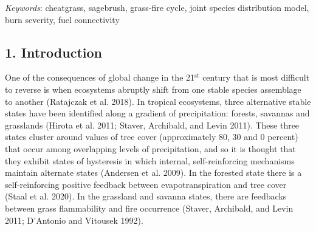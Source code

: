 \documentclass[
  12pt,
]{article}
\begin{document}
\vspace{3mm}
\vspace{5mm}

\emph{Keywords}: cheatgrass, sagebrush, grass-fire cycle, joint species
distribution model, burn severity, fuel connectivity

\newpage

\hypertarget{introduction}{%
\subsection{1. Introduction}\label{introduction}}

One of the consequences of global change in the 21\(^\text{st}\) century
that is most difficult to reverse is when ecosystems abruptly shift from
one stable species assemblage to another (Ratajczak et al. 2018). In
tropical ecosystems, three alternative stable states have been
identified along a gradient of precipitation: forests, savannas and
grasslands (Hirota et al. 2011; Staver, Archibald, and Levin 2011).
These three states cluster around values of tree cover (approximately
80, 30 and 0 percent) that occur among overlapping levels of
precipitation, and so it is thought that they exhibit states of
hysteresis in which internal, self-reinforcing mechanisms maintain
alternate states (Andersen et al. 2009). In the forested state there is
a self-reinforcing positive feedback between evapotranspiration and tree
cover (Staal et al. 2020). In the grassland and savanna states, there
are feedbacks between grass flammability and fire occurrence (Staver,
Archibald, and Levin 2011; D'Antonio and Vitousek 1992).
\end{document}
